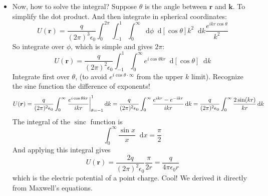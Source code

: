 \documentclass[11pt, a4paper]{article}
\newcommand{\diff}{\mathop{}\!\mathrm{d}} %
\renewcommand{\vec}[1]{\bm{#1}} %
\renewcommand{\r}{\vec{r}}
\begin{document}
\begin{itemize}
	\item Now, how to solve the integral? Suppose $ \theta $ is the angle between $ \r $ and $ \vec{k} $. To simplify the dot product. And then integrate in spherical coordinates:
	\begin{equation*}
		U(\r) =  \frac{q}{(2\pi)^{3}\epsilon_{0}} \int_{0}^{2\pi}\int_{-1}^{1}\int_{0}^{\infty} \diff \phi \diff [\cos \theta] k^{2} \diff k \frac{e^{ik r\cos \theta}}{k^{2}} 
	\end{equation*}
	So integrate over $ \phi $, which is simple and gives $ 2\pi $:
	\begin{equation*}
		U(\r) = \frac{q}{(2\pi)^{2}\epsilon_{0}} \int_{-1}^{1}\int_{0}^{\infty} e^{i \cos \theta k r} \diff[\cos \theta] \diff k
	\end{equation*}
	Integrate first over $ \theta $, (to avoid $ e^{i \cos \theta \cdot \infty} $ from the upper $ k $ limit). Recognize the sine function the difference of exponents!
	\begin{equation*}
		U(\r) = \frac{q}{(2\pi)^{2}\epsilon_{0}} \int_{0}^{\infty} \eval{\frac{e^{i \cos \theta k r}}{i k r}}_{\theta = -1}^{1} \diff k = \frac{q}{(2\pi)^{2}\epsilon_{0}} \int_{0}^{\infty}\frac{e^{ikr}-e^{-ikr}}{ikr} \diff k = \frac{q}{(2\pi)^{2}\epsilon_{0}} \int_{0}^{\infty}\frac{2\sin (kr)}{kr} \diff k
	\end{equation*}
	The integral of the $ \operatorname{sinc} $ function is
	\begin{equation*}
		\int_{0}^{\infty} \frac{\sin x}{x}\diff x = \frac{\pi}{2}
	\end{equation*}
	And applying this integral gives
	\begin{equation*}
		U(\r) = \frac{2q}{(2\pi)^{2}\epsilon_{0}}\frac{\pi}{2r} = \frac{q}{4\pi \epsilon_{0}r}
	\end{equation*}
	which is the electric potential of a point charge. Cool! We derived it directly from Maxwell's equations.
\end{itemize}
\end{document}
